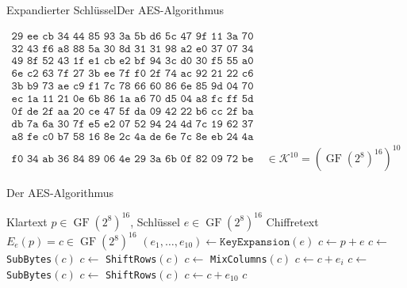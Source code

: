 \documentclass{beamer}
\newcommand{\mc}{\mathcal}
\newcommand{\expand}{\texttt{KeyExpansion}}
\newcommand{\GF}{\operatorname{GF}}
\theoremstyle{plain}
\begin{document}
\begin{frame}{Expandierter Schlüssel}{Der AES-Algorithmus}
\begin{small}
 \begin{align*}
\texttt{29 ee cb 34 44 85 93 3a 5b d6 5c 47 9f 11 3a 70} & \\  
\texttt{32 43 f6 a8 88 5a 30 8d 31 31 98 a2 e0 37 07 34} & \\
\texttt{49 8f 52 43 1f e1 cb e2 bf 94 3c d0 30 f5 55 a0} & \\
\texttt{6e c2 63 7f 27 3b ee 7f f0 2f 74 ac 92 21 22 c6} & \\
\texttt{3b b9 73 ae c9 f1 7c 78 66 60 86 6e 85 9d 04 70} & \\
\texttt{ec 1a 11 21 0e 6b 86 1a a6 70 d5 04 a8 fc ff 5d} & \\
\texttt{0f de 2f aa 20 ce 47 5f da 09 42 22 b6 cc 2f ba} & \\
\texttt{db 7a 6a 30 7f e5 e2 07 52 94 24 4d 7c 19 62 37} & \\
\texttt{a8 fe c0 b7 58 16 8e 2c 4a de 6e 7c 8e eb 24 4a} & \\
\texttt{f0 34 ab 36 84 89 06 4e 29 3a 6b 0f 82 09 72 be} & \; \in \mc K^{10} = (\GF(2^8)^{16})^{10}
 \end{align*}
 \end{small}
\end{frame}

\begin{frame}{Der AES-Algorithmus}{\ }
 \begin{algorithmic}
  \Require Klartext $p \in \GF(2^8)^{16}$, Schlüssel $e \in \GF(2^8)^{16}$
  \Ensure Chiffretext $E_e(p) = c \in \GF(2^8)^{16}$
  \State $(e_1, \dots, e_{10}) \gets \expand(e)$
  \State $c \gets p + e$
  \State $c \gets$ \texttt{SubBytes}$(c)$
  \State $c \gets$ \texttt{ShiftRows}$(c)$
  \State $c \gets$ \texttt{MixColumns}$(c)$
  \State $c \gets c + e_i$
  \EndFor
  \State $c \gets $ \texttt{SubBytes}$(c)$
  \State $c \gets $ \texttt{ShiftRows}$(c)$
  \State $c \gets c + e_{10}$
  \State \Return $c$
 \end{algorithmic}
\end{frame}
\end{document}

